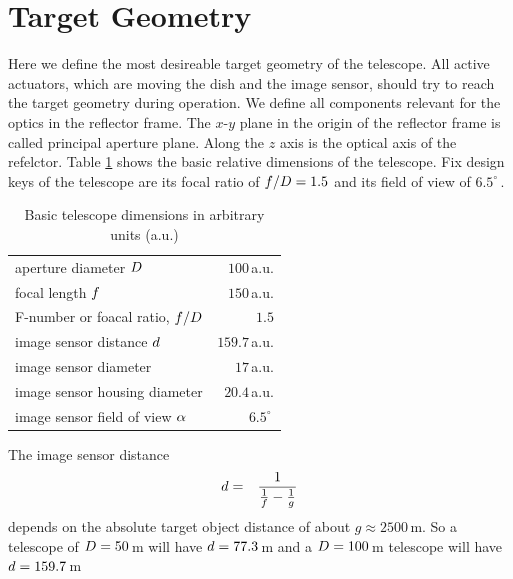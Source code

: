 \documentclass[11pt,a4paper,oneside,titlepage]{article}
\begin{document}
\section{Target Geometry}
%
Here we define the most desireable target geometry of the telescope. 
%
All active actuators, which are moving the dish and the image sensor, should try to reach the target geometry during operation. 
%
We define all components relevant for the optics in the reflector frame. The $x$-$y$ plane in the origin of the reflector frame is called principal aperture plane. 
%
Along the $z$ axis is the optical axis of the refelctor.
%
Table \ref{TabBasicDimensions} shows the basic relative dimensions of the telescope.
%
Fix design keys of the telescope are its focal ratio of $f/D = 1.5$ and its field of view of $6.5^\circ\,$.  
%
\begin{table}[H]
    \begin{center}
        \begin{tabular}{lr}
            \toprule
            aperture diameter $D$ & $100\,$a.u.\\
            focal length $f$ & $150\,$a.u.\\
            F-number or foacal ratio, $f/D$ & $1.5$\\
            image sensor distance $d$ & $159.7\,$a.u.\\
            image sensor diameter & $17\,$a.u.\\
            image sensor housing diameter & $20.4\,$a.u.\\
            image sensor field of view $\alpha$ & $6.5^\circ\,$\\
            \bottomrule
        \end{tabular}
        \caption[]{Basic telescope dimensions in arbitrary units (a.u.)}
        \label{TabBasicDimensions}
    \end{center}
\end{table}
%
The image sensor distance
%
\begin{eqnarray}
d &=& \frac{1}{\frac{1}{f} - \frac{1}{g}}
\end{eqnarray}
%
depends on the absolute target object distance of about $g \approx 2500\,$m.
%
So a telescope of $D = 50\,$m will have $d = 77.3\,$m and a $D = 100\,$m telescope will have $d = 159.7\,$m
%
\end{document}
